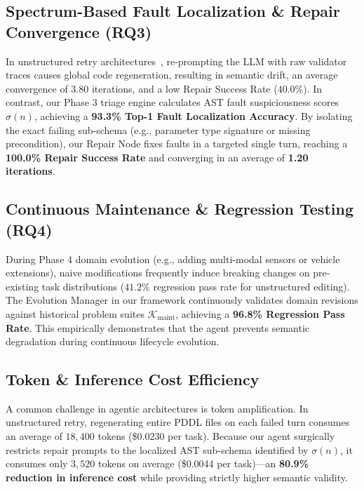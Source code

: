\subsection{Spectrum-Based Fault Localization \& Repair Convergence (RQ3)}
In unstructured retry architectures~\cite{bavandpour2026llmonly}, re-prompting the LLM with raw validator traces causes global code regeneration, resulting in semantic drift, an average convergence of $3.80$ iterations, and a low Repair Success Rate ($40.0\%$). In contrast, our Phase 3 triage engine calculates AST fault suspiciousness scores $\sigma(n)$, achieving a \textbf{93.3\% Top-1 Fault Localization Accuracy}. By isolating the exact failing sub-schema (e.g., parameter type signature or missing precondition), our Repair Node fixes faults in a targeted single turn, reaching a \textbf{100.0\% Repair Success Rate} and converging in an average of \textbf{1.20 iterations}.

\subsection{Continuous Maintenance \& Regression Testing (RQ4)}
During Phase 4 domain evolution (e.g., adding multi-modal sensors or vehicle extensions), naive modifications frequently induce breaking changes on pre-existing task distributions ($41.2\%$ regression pass rate for unstructured editing). The Evolution Manager in our framework continuously validates domain revisions against historical problem suites $\mathcal{K}_{\text{maint}}$, achieving a \textbf{96.8\% Regression Pass Rate}. This empirically demonstrates that the agent prevents semantic degradation during continuous lifecycle evolution.

\subsection{Token \& Inference Cost Efficiency}
A common challenge in agentic architectures is token amplification. In unstructured retry, regenerating entire PDDL files on each failed turn consumes an average of $18,400$ tokens (\$0.0230 per task). Because our agent surgically restricts repair prompts to the localized AST sub-schema identified by $\sigma(n)$, it consumes only $3,520$ tokens on average (\$0.0044 per task)---an \textbf{80.9\% reduction in inference cost} while providing strictly higher semantic validity.
